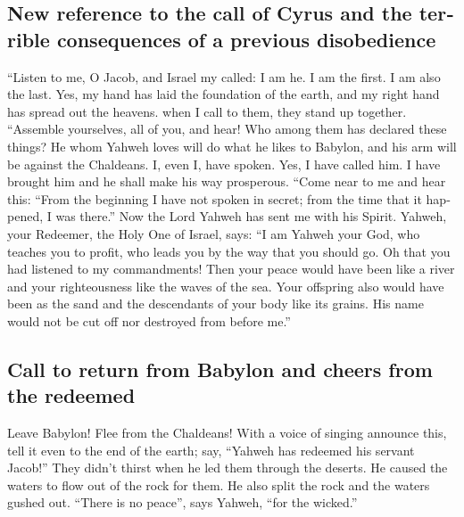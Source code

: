 \begin{paracol}{2}
\begin{otherlanguage}{english}
\hypertarget{new-reference-to-the-call-of-cyrus-and-the-terrible-consequences-of-a-previous-disobedience}{%
\subsection{New reference to the call of Cyrus and the terrible
consequences of a previous
disobedience}\label{new-reference-to-the-call-of-cyrus-and-the-terrible-consequences-of-a-previous-disobedience}}

 ``Listen to me, O Jacob, and Israel my called: I am he.
I am the first. I am also the last.  Yes, my hand has
laid the foundation of the earth, and my right hand has spread out the
heavens. when I call to them, they stand up together. 
``Assemble yourselves, all of you, and hear! Who among them has declared
these things? He whom Yahweh loves will do what he likes to Babylon, and
his arm will be against the Chaldeans.  I, even I, have
spoken. Yes, I have called him. I have brought him and he shall make his
way prosperous.  ``Come near to me and hear this: ``From
the beginning I have not spoken in secret; from the time that it
happened, I was there.'' Now the Lord Yahweh has sent me with his
Spirit.  Yahweh, your Redeemer, the Holy One of Israel,
says: ``I am Yahweh your God, who teaches you to profit, who leads you
by the way that you should go.  Oh that you had listened
to my commandments! Then your peace would have been like a river and
your righteousness like the waves of the sea.  Your
offspring also would have been as the sand and the descendants of your
body like its grains. His name would not be cut off nor destroyed from
before me.''

\hypertarget{call-to-return-from-babylon-and-cheers-from-the-redeemed}{%
\subsection{Call to return from Babylon and cheers from the
redeemed}\label{call-to-return-from-babylon-and-cheers-from-the-redeemed}}

 Leave Babylon! Flee from the Chaldeans! With a voice of
singing announce this, tell it even to the end of the earth; say,
``Yahweh has redeemed his servant Jacob!''  They didn't
thirst when he led them through the deserts. He caused the waters to
flow out of the rock for them. He also split the rock and the waters
gushed out.  ``There is no peace'', says Yahweh, ``for
the wicked.''


\end{otherlanguage}
\end{paracol}
